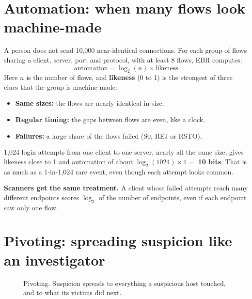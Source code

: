 \section{Automation: when many flows look machine-made}
A person does not send 10,000 near-identical connections. For each group of flows sharing a client, server, port and protocol, with at least 8 flows, EBR computes:
\[
\text{automation} = \log_2(n) \times \text{likeness}
\]
Here $n$ is the number of flows, and \textbf{likeness} (0 to 1) is the strongest of three clues that the group is machine-made:
\begin{itemize}
\item \textbf{Same sizes:} the flows are nearly identical in size.
\item \textbf{Regular timing:} the gaps between flows are even, like a clock.
\item \textbf{Failures:} a large share of the flows failed (S0, REJ or RSTO).
\end{itemize}

\begin{example}
1,024 login attempts from one client to one server, nearly all the same size, gives likeness close to 1 and automation of about $\log_2(1024) \times 1 = $ \textbf{10 bits}. That is as much as a 1-in-1,024 rare event, even though each attempt looks common.
\end{example}

\textbf{Scanners get the same treatment.} A client whose failed attempts reach many different endpoints scores $\log_2$ of the number of endpoints, even if each endpoint saw only one flow.

\section{Pivoting: spreading suspicion like an investigator}
\begin{figure}[H]
\centering
{}
\caption{Pivoting. Suspicion spreads to everything a suspicious host touched, and to what its victims did next.}
\end{figure}

